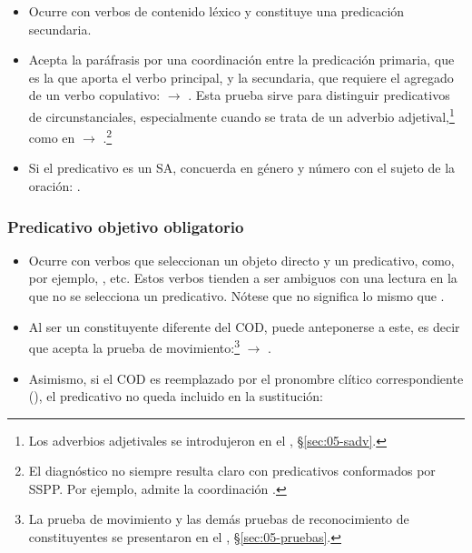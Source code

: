 \begin{itemize}
  \item Ocurre con verbos de contenido léxico y constituye una predicación
        secundaria.
  \item Acepta la paráfrasis por una coordinación entre la predicación primaria,
        que es la que aporta el verbo principal, y la secundaria, que requiere
        el agregado de un verbo copulativo:  $\rightarrow$ . Esta prueba sirve para distinguir predicativos de
        circunstanciales, especialmente cuando se trata de un adverbio
        adjetival,\footnote{Los adverbios adjetivales se introdujeron en el
        , §\ref{sec:05-sadv}.} como en 
        $\rightarrow$ .\footnote{El
        diagnóstico no siempre resulta claro con predicativos conformados por
        SSPP. Por ejemplo,  admite la
        coordinación .}
  \item Si el predicativo es un SA, concuerda en género y número con el sujeto
        de la oración: .
\end{itemize}

\subsubsection{Predicativo objetivo obligatorio}\label{sec:09-poo}

\begin{itemize}
  \item Ocurre con verbos que seleccionan un objeto directo y un predicativo,
        como, por ejemplo, ,
        etc. Estos verbos tienden a ser ambiguos con una lectura en la que no se
        selecciona un predicativo. Nótese que 
        no significa lo mismo que .
  \item Al ser un constituyente diferente del COD, puede anteponerse a este, es
        decir que acepta la prueba de movimiento:\footnote{La prueba de
        movimiento y las demás pruebas de reconocimiento de constituyentes se
        presentaron en el , §\ref{sec:05-pruebas}.}  $\rightarrow$ .
  \item Asimismo, si el COD es reemplazado por el pronombre clítico
        correspondiente (), el predicativo no queda
        incluido en la sustitución:
\end{itemize}

